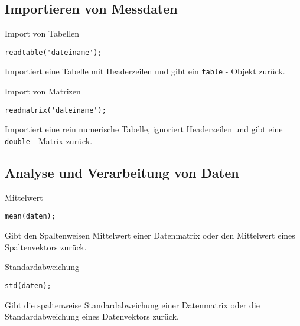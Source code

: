         \subsection{Importieren von Messdaten}
        \begin{CodeErklaerungBox}{Import von Tabellen}
            \begin{lstlisting}
readtable('dateiname');
            \end{lstlisting}
            \tcblower
            Importiert eine Tabelle mit Headerzeilen und gibt ein \texttt{table} - Objekt zurück.
        \end{CodeErklaerungBox}
        \begin{CodeErklaerungBox}{Import von Matrizen}
            \begin{lstlisting}
readmatrix('dateiname');
            \end{lstlisting}
            \tcblower
            Importiert eine rein numerische Tabelle, ignoriert Headerzeilen und gibt eine \texttt{double} - Matrix zurück.
        \end{CodeErklaerungBox}
        \subsection{Analyse und Verarbeitung von Daten}
        \begin{CodeErklaerungBox}{Mittelwert}
            \begin{lstlisting}
mean(daten);
            \end{lstlisting}
            \tcblower
            Gibt den Spaltenweisen Mittelwert einer Datenmatrix oder den Mittelwert eines Spaltenvektors zurück.
        \end{CodeErklaerungBox}
        \begin{CodeErklaerungBox}{Standardabweichung}
            \begin{lstlisting}
std(daten);
            \end{lstlisting}
            \tcblower
            Gibt die spaltenweise Standardabweichung einer Datenmatrix oder die Standardabweichung eines Datenvektors zurück.
        \end{CodeErklaerungBox}
        